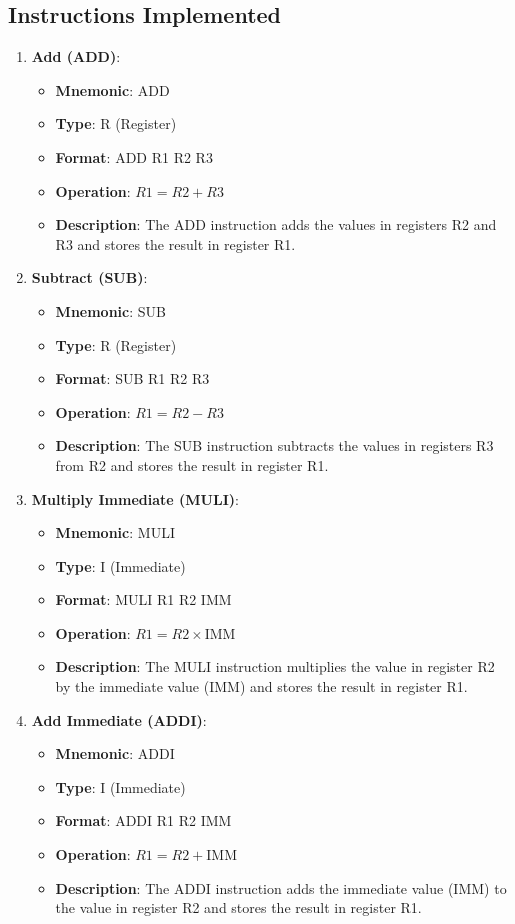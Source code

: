 \documentclass{article}
\begin{document}
\subsection{Instructions Implemented}
\begin{enumerate}
    \item \textbf{Add (ADD)}:
        \begin{itemize}
            \item \textbf{Mnemonic}: ADD
            \item \textbf{Type}: R (Register)
            \item \textbf{Format}: ADD R1 R2 R3
            \item \textbf{Operation}: \(R1 = R2 + R3\)
            \item \textbf{Description}: The ADD instruction adds the values in registers R2 and R3 and stores the result in register R1.
        \end{itemize}
    \item \textbf{Subtract (SUB)}:
        \begin{itemize}
            \item \textbf{Mnemonic}: SUB
            \item \textbf{Type}: R (Register)
            \item \textbf{Format}: SUB R1 R2 R3
            \item \textbf{Operation}: \(R1 = R2 - R3\)
            \item \textbf{Description}: The SUB instruction subtracts the values in registers R3 from R2 and stores the result in register R1.
        \end{itemize}
    \item \textbf{Multiply Immediate (MULI)}:
    \begin{itemize}
        \item \textbf{Mnemonic}: MULI
        \item \textbf{Type}: I (Immediate)
        \item \textbf{Format}: MULI R1 R2 IMM
        \item \textbf{Operation}: \(R1 = R2 \times \text{IMM}\)
        \item \textbf{Description}: The MULI instruction multiplies the value in register R2 by the immediate value (IMM) and stores the result in register R1.
    \end{itemize}    

    \item \textbf{Add Immediate (ADDI)}:
    \begin{itemize}
        \item \textbf{Mnemonic}: ADDI
        \item \textbf{Type}: I (Immediate)
        \item \textbf{Format}: ADDI R1 R2 IMM
        \item \textbf{Operation}: \(R1 = R2 + \text{IMM}\)
        \item \textbf{Description}: The ADDI instruction adds the immediate value (IMM) to the value in register R2 and stores the result in register R1.
    \end{itemize}


\end{enumerate}
\end{document}
